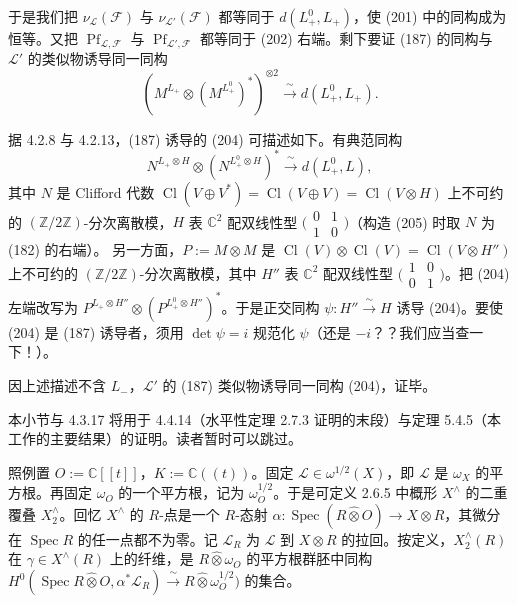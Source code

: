 于是我们把 $\nu_{\mathcal{L}}(\mathcal{F})$ 与 $\nu_{\mathcal{L}'}(\mathcal{F})$ 都等同于 $d(L_{+}^{0},L_{+})$，使 (201) 中的同构成为恒等。又把 $\operatorname{Pf}_{\mathcal{L},\mathcal{F}}$ 与 $\operatorname{Pf}_{\mathcal{L}',\mathcal{F}}$ 都等同于 (202) 右端。剩下要证 (187) 的同构与 $\mathcal{L}'$ 的类似物诱导同一同构
\begin{equation}\tag{204}
(M^{L_{+}}\otimes(M^{L_{+}^{0}})^{*})^{\otimes 2}\xrightarrow{\ \sim\ }d(L_{+}^{0},L_{+}).
\end{equation}

据 4.2.8 与 4.2.13，(187) 诱导的 (204) 可描述如下。有典范同构
\begin{equation}\tag{205}
N^{L_{+}\otimes H}\otimes(N^{L_{+}^{0}\otimes H})^{*}\xrightarrow{\ \sim\ }d(L_{+}^{0},L),
\end{equation}
其中 $N$ 是 Clifford 代数 $\operatorname{Cl}(V\oplus V^{*})=\operatorname{Cl}(V\oplus V)=\operatorname{Cl}(V\otimes H)$ 上不可约的 $(\mathbb{Z}/2\mathbb{Z})$-分次离散模，$H$ 表 $\mathbb{C}^{2}$ 配双线性型 $\bigl(\begin{smallmatrix}0&1\\1&0\end{smallmatrix}\bigr)$（构造 (205) 时取 $N$ 为 (182) 的右端）。
另一方面，$P:=M\otimes M$ 是 $\operatorname{Cl}(V)\otimes\operatorname{Cl}(V)=\operatorname{Cl}(V\otimes H'')$ 上不可约的 $(\mathbb{Z}/2\mathbb{Z})$-分次离散模，其中 $H''$ 表 $\mathbb{C}^{2}$ 配双线性型 $\bigl(\begin{smallmatrix}1&0\\0&1\end{smallmatrix}\bigr)$。把 (204) 左端改写为 $P^{L_{+}\otimes H''}\otimes(P^{L_{+}^{0}\otimes H''})^{*}$。于是正交同构 $\psi:H''\xrightarrow{\ \sim\ }H$ 诱导 (204)。要使 (204) 是 (187) 诱导者，须用 $\det\psi=i$ 规范化 $\psi$（还是 $-i$？？我们应当查一下！）。

因上述描述不含 $L_{-}$，$\mathcal{L}'$ 的 (187) 类似物诱导同一同构 (204)，证毕。

 本小节与 4.3.17 将用于 4.4.14（水平性定理 2.7.3 证明的末段）与定理 5.4.5（本工作的主要结果）的证明。读者暂时可以跳过。

照例置 $O:=\mathbb{C}[[t]]$，$K:=\mathbb{C}((t))$。固定 $\mathcal{L}\in\omega^{1/2}(X)$，即 $\mathcal{L}$ 是 $\omega_{X}$ 的平方根。再固定 $\omega_{O}$ 的一个平方根，记为 $\omega_{O}^{1/2}$。于是可定义 2.6.5 中概形 $X^{\wedge}$ 的二重覆叠 $X_{2}^{\wedge}$。回忆 $X^{\wedge}$ 的 $R$-点是一个 $R$-态射 $\alpha:\operatorname{Spec}(R\hat{\otimes}O)\to X\otimes R$，其微分在 $\operatorname{Spec} R$ 的任一点都不为零。记 $\mathcal{L}_{R}$ 为 $\mathcal{L}$ 到 $X\otimes R$ 的拉回。按定义，$X_{2}^{\wedge}(R)$ 在 $\gamma\in X^{\wedge}(R)$ 上的纤维，是 $R\hat{\otimes}\omega_{O}$ 的平方根群胚中同构 $H^{0}(\operatorname{Spec} R\hat{\otimes}O,\alpha^{*}\mathcal{L}_{R})\xrightarrow{\ \sim\ }R\hat{\otimes}\omega_{O}^{1/2})$ 的集合。

